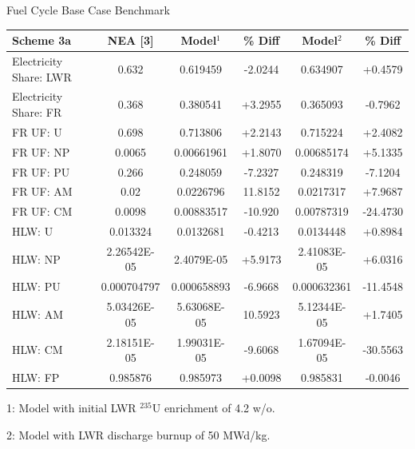 \documentclass[pdf, autumn, slideColor, nocolorBG]{prosper}
\newcommand{\superscript}[1]{\ensuremath{^{\textrm{#1}}}}
\newcommand{\nuc}[2]{\superscript{#2}{#1}}
\begin{document}
\begin{slide}{Fuel Cycle Base Case Benchmark}
\tiny
\begin{center}
\begin{tabular}{|l||c||c|c||c|c|}
\hline
\textbf{Scheme 3a}     & \textbf{NEA [3]} & \textbf{Model\superscript{1}} & \textbf{\% Diff} & \textbf{Model\superscript{2}} & \textbf{\% Diff} \\
\hline
Electricity Share: LWR & 0.632       & 0.619459             & -2.0244 & 0.634907             & +0.4579 \\
\hline
Electricity Share: FR  & 0.368       & 0.380541             & +3.2955 & 0.365093             & -0.7962 \\
\hline
FR UF: U               & 0.698       & 0.713806             & +2.2143 & 0.715224             & +2.4082 \\
\hline
FR UF: NP              & 0.0065      & 0.00661961           & +1.8070 & 0.00685174           & +5.1335 \\
\hline
FR UF: PU              & 0.266       & 0.248059             & -7.2327 & 0.248319             & -7.1204 \\
\hline
FR UF: AM              & 0.02        & 0.0226796            & 11.8152 & 0.0217317            & +7.9687 \\
\hline
FR UF: CM              & 0.0098      & 0.00883517           & -10.920 & 0.00787319           & -24.4730\\
\hline
HLW: U                 & 0.013324    & 0.0132681            & -0.4213 & 0.0134448            & +0.8984 \\
\hline
HLW: NP                & 2.26542E-05 & 2.4079E-05           & +5.9173 & 2.41083E-05          & +6.0316 \\
\hline
HLW: PU                & 0.000704797 & 0.000658893          & -6.9668 & 0.000632361          & -11.4548\\
\hline
HLW: AM                & 5.03426E-05 & 5.63068E-05          & 10.5923 & 5.12344E-05          & +1.7405 \\
\hline
HLW: CM                & 2.18151E-05 & 1.99031E-05          & -9.6068 & 1.67094E-05          & -30.5563\\
\hline
HLW: FP                & 0.985876    & 0.985973             & +0.0098 & 0.985831             & -0.0046 \\
\hline
\end{tabular}
\end{center}

1: Model with initial LWR \nuc{U}{235} enrichment of 4.2 w/o. 

2: Model with LWR discharge burnup of 50 MWd/kg.
\end{slide}
\end{document}
